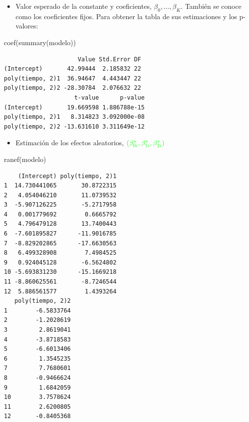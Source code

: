 \documentclass[
]{book}
\newenvironment{Shaded}{\begin{snugshade}}{\end{snugshade}}
\newcommand{\FunctionTok}[1]{\textcolor[rgb]{0.00,0.00,0.00}{#1}}
\newcommand{\NormalTok}[1]{#1}
\providecommand{\tightlist}{%
  \setlength{\itemsep}{0pt}\setlength{\parskip}{0pt}}
\begin{document}
\begin{itemize}
\tightlist
\item
  Valor esperado de la constante y coeficientes, \(\beta_0, \ldots, \beta_K\). También se conoce como los coeficientes fijos. Para obtener la tabla de sus estimaciones y los p-valores:
\end{itemize}

\begin{Shaded}
\begin{Highlighting}[]
\FunctionTok{coef}\NormalTok{(}\FunctionTok{summary}\NormalTok{(modelo))}
\end{Highlighting}
\end{Shaded}

\begin{verbatim}
                     Value Std.Error DF
(Intercept)       42.99444  2.185832 22
poly(tiempo, 2)1  36.94647  4.443447 22
poly(tiempo, 2)2 -28.30784  2.076632 22
                    t-value      p-value
(Intercept)       19.669598 1.886788e-15
poly(tiempo, 2)1   8.314823 3.092000e-08
poly(tiempo, 2)2 -13.631610 3.311649e-12
\end{verbatim}

\begin{itemize}
\tightlist
\item
  Estimación de los efectos aleatorios, \(\color{green}{(\beta_{0i}^{*},\beta_{1i}^{*},\beta_{2i}^{*})}\)
\end{itemize}

\begin{Shaded}
\begin{Highlighting}[]
\FunctionTok{ranef}\NormalTok{(modelo)}
\end{Highlighting}
\end{Shaded}

\begin{verbatim}
    (Intercept) poly(tiempo, 2)1
1  14.730441065       30.8722315
2   4.054046210       11.0739532
3  -5.907126225       -5.2717958
4   0.001779692        0.6665792
5   4.796479128       13.7400443
6  -7.601895827      -11.9016785
7  -8.829202865      -17.6630563
8   6.499328908        7.4984525
9   0.924045128       -6.5624802
10 -5.693831230      -15.1669218
11 -8.860625561       -8.7246544
12  5.886561577        1.4393264
   poly(tiempo, 2)2
1        -6.5833764
2        -1.2028619
3         2.8619041
4        -3.8718583
5        -6.6013406
6         1.3545235
7         7.7680601
8        -0.9466624
9         1.6842059
10        3.7578624
11        2.6200805
12       -0.8405368
\end{verbatim}
\end{document}
